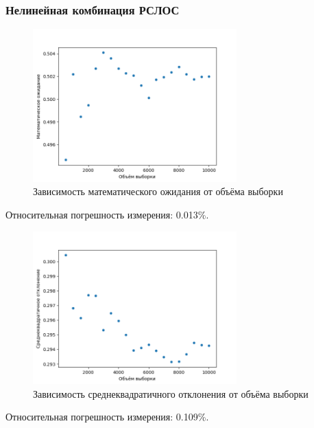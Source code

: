 \documentclass[bachelor, och, labwork]{SCWorks}
\begin{document}
\subsubsection{Нелинейная комбинация РСЛОС}
\begin{figure}[H]
  \centering
  \includegraphics[width=0.7\textwidth]{nfsr_me.png}
  \caption{Зависимость математического ожидания от объёма выборки}
\end{figure}
Относительная погрешность измерения: 0.013\%.

\begin{figure}[H]
  \centering
  \includegraphics[width=0.7\textwidth]{nfsr_st.png}
  \caption{Зависимость среднеквадратичного отклонения от объёма выборки}
\end{figure}
Относительная погрешность измерения: 0.109\%.
\end{document}
